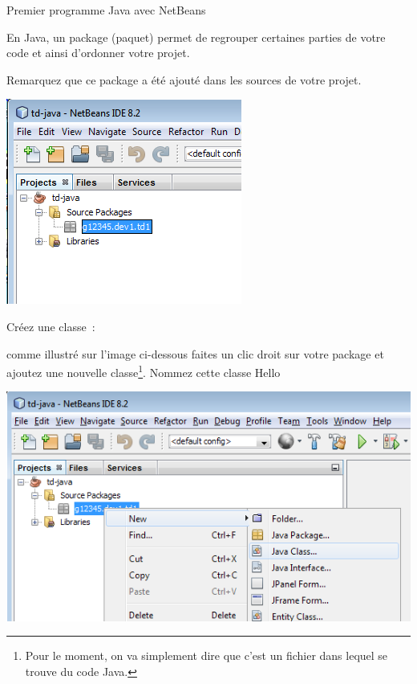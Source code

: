 \documentclass[a4paper,11pt]{article}
\begin{document}
\begin{Tutoriel}{Premier programme Java avec NetBeans}
\begin{steps}
			En Java, un package (paquet) permet de regrouper certaines parties de votre code
			et ainsi d'ordonner votre projet.

			Remarquez que ce package a été ajouté dans les sources de votre projet. 
			\bigskip
			\begin{center}
				\includegraphics{images/nb_newproject_package3}
			\end{center}
			


		\item Créez une classe~:
		
			comme illustré sur l'image ci-dessous faites un clic droit sur votre package 
			et ajoutez une nouvelle classe\footnote{Pour le moment, 
			on va simplement dire que c'est un fichier dans lequel se trouve du code Java.}. 
			Nommez cette classe {Hello}
		
			\bigskip
			
			\begin{center}
				\includegraphics[width=.9\textwidth]{images/nb_newproject_new_class}
			\end{center}



\end{steps}
\end{Tutoriel}
\end{document}
